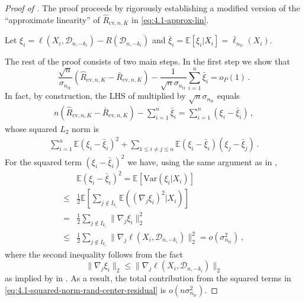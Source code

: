 \documentclass[11pt]{article}
\theoremstyle{plain}
\newcommand{\cv}{{\mathrm{cv}}}
\newcommand{\tr}{{\mathrm{tr}}}
\newcommand{\D}{{\mathcal{D}}}
\newcommand{\var}{\mathrm{Var}}
\begin{document}
\begin{proof}[Proof of ]
The proof proceeds by rigorously establishing a modified version of the ``approximate linearity'' of $\hat R_{\cv,n,K}$ in \eqref{eq:4.1-approx-lin}.

Let $\xi_i = \ell(X_i,\D_{n,-k_i}) - R(\D_{n,-k_i})$ and $\bar \xi_i =\mathbb E\left[\xi_i|X_i\right]=\bar\ell_{n_\tr}(X_i)$.

The rest of the proof consists of two main steps.  In the first step we show that
 \begin{equation}\label{eq:4.1-approx-lin-long}
     \frac{\sqrt{n}}{\sigma_{n_\tr}}\left(\hat R_{\cv,n,K}-\bar R_{\cv,n,K}\right)-\frac{1}{\sqrt{n}\sigma_{n_\tr}}\sum_{i=1}^n\bar\xi_i=o_P(1)\,.
 \end{equation}
In fact, by construction, the LHS of  multiplied by $\sqrt{n}\sigma_{n_\tr}$ equals 
\begin{align*}
n\left(\hat R_{\cv,n,K}-\bar R_{\cv,n,K}\right)-\sum_{i=1}^n\bar\xi_i=\sum_{i=1}^n (\xi_i-\bar\xi_i)\,,
\end{align*}
whose squared $L_2$ norm is
\begin{align}\label{eq:4.1-squared-norm-rand-center-residual}
   \sum_{i=1}^n\mathbb E(\xi_i-\bar\xi_i)^2 + \sum_{1\le i\neq j\le n} \mathbb E(\xi_i-\bar\xi_i)(\xi_j-\bar \xi_j)\,. 
\end{align}
For the squared term $(\xi_i-\bar\xi_i)^2$ we have, using the same argument as in ,
\begin{align*}
    &\mathbb E(\xi_i-\bar\xi_i)^2 
    = \mathbb E\left[\var(\xi_i|X_i)\right]\\
    \le & \frac{1}{2}\mathbb E\left[\sum_{j\notin I_{k_i}}\mathbb E((\nabla_j \xi_i)^2|X_i)\right]\\
    = & \frac{1}{2}\sum_{j\notin I_{k_i}}\|\nabla_j \xi_i\|_2^2\\
    \le & \frac{1}{2}\sum_{j\notin I_{k_i}}\|\nabla_j \ell(X_i,\D_{n,-k_i})\|_2^2=o(\sigma_{n_\tr}^2)\,,
\end{align*}
where the second inequality follows from the fact
$$\|\nabla_j\xi_i\|_2\le \|\nabla_j\ell(X_i,\D_{n,-k_i})\|_2$$ as implied by   in .  As a result, the total contribution from the squared terms in \eqref{eq:4.1-squared-norm-rand-center-residual} is $o(n\sigma_{n_\tr}^2)$.


\end{proof}
\end{document}
